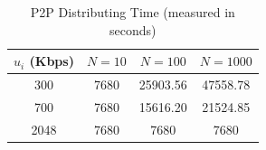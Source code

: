 \begin{exercise}[]
\begin{solution}
  \begin{table}[h]
    \centering
    \caption{P2P Distributing Time (measured in seconds)}
    \vspace{0.6em}
    \begin{tabular}{cccc}
    \hline
    $u_i$ (Kbps) & $N = 10$ & $N = 100$ & $N = 1000$ \\ \hline
    300          & 7680     & 25903.56     & 47558.78      \\
    700          & 7680     & 15616.20     & 21524.85      \\
    2048         & 7680     & 7680     & 7680      \\ \hline
    \end{tabular}
  \end{table}

  \end{solution}
  \label{ex7}
\end{exercise}